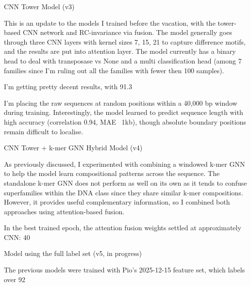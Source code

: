 \documentclass[12pt]{article}
\begin{document}
CNN Tower Model (v3)

This is an update to the models I trained before the vacation, with the tower-based CNN network and RC-invariance via fusion. The model generally goes through three CNN layers with kernel sizes 7, 15, 21 to capture difference motifs, and the results are put into attention layer. The model currently has a binary head to deal with transposase vs None and a multi classification head (among 7 families since I'm ruling out all the families with fewer then 100 samples). 

I'm getting pretty decent results, with 91.3%

I'm placing the raw sequences at random positions within a 40,000 bp window during training. Interestingly, the model learned to predict sequence length with high accuracy (correlation 0.94, MAE ~1kb), though absolute boundary positions remain difficult to localise.

CNN Tower + k-mer GNN Hybrid Model (v4)

As previously discussed, I experimented with combining a windowed k-mer GNN to help the model learn compositional patterns across the sequence. The standalone k-mer GNN does not perform as well on its own as it tends to confuse superfamilies within the DNA class since they share similar k-mer compositions. However, it provides useful complementary information, so I combined both approaches using attention-based fusion.

In the best trained epoch, the attention fusion weights settled at approximately CNN: 40%

Model using the full label set (v5, in progress)

The previous models were trained with Pio's 2025-12-15 feature set, which labels over 92%
\end{document}
